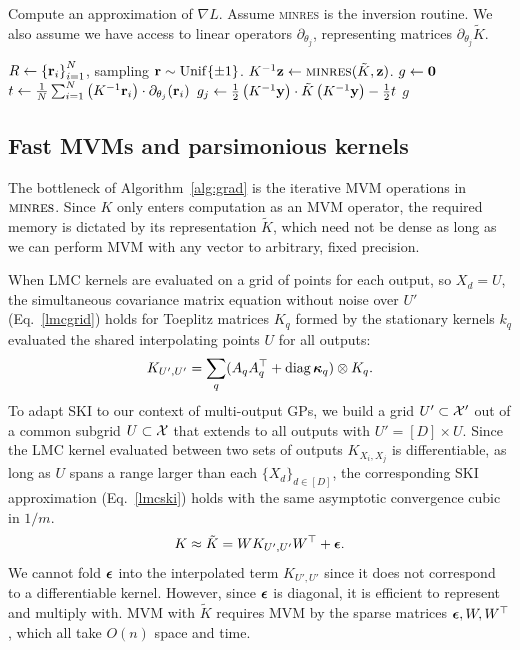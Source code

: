 \documentclass{article}
\begin{document}
\begin{algorithm}[!ht]
  \caption{Compute an approximation of $\nabla L$. Assume \textsc{minres} is the inversion routine. We also assume we have access to linear operators $\partial_{\theta_j}$, representing matrices $\partial_{\theta_j}\tilde{K}$.} \label{alg:grad}
\begin{algorithmic}[1]
  \State $R\gets\left\{ {\textbf{r}}_i \right\}_{ i=1 }^{ N }$, sampling ${\textbf{r}}\sim\operatorname{Unif}\{\pm 1\}$.
\State $K^{-1}\textbf{z}\gets\textsc{minres}(\tilde{K},\textbf{z})$.
\EndFor
\State $g\gets \textbf{0}$
\State $t\gets \frac{1}{N}\sum_{i=1}^{N}\left({K^{-1}{\textbf{r}}_i}\right)\cdot \partial_{\theta_j}({\textbf{r}}_i)$
\State $g_j\gets \frac{1}{2}\left({K^{-1}\textbf{y}}\right)\cdot \tilde{K}\left({K^{-1}\textbf{y}}\right)-\frac{1}{2}t$
\EndFor
\State \Return $g$ 
\EndProcedure
\end{algorithmic}
\end{algorithm}

\subsection{Fast MVMs and parsimonious kernels}\label{fast-mvm}

The bottleneck of Algorithm~\ref{alg:grad} is the iterative MVM operations in $\textsc{minres}$. Since $K$ only enters computation as an MVM operator, the required memory is dictated by its representation $\tilde{K}$, which need not be dense as long as we can perform MVM with any vector to arbitrary, fixed precision.

When LMC kernels are evaluated on a grid of points for each output, so $X_d=U$, the simultaneous covariance matrix equation without noise over ${U'}$  (Eq.~\ref{lmcgrid}) holds for Toeplitz matrices $K_q$ formed by the stationary kernels $k_q$ evaluated the shared interpolating points $U$ for all outputs:
\begin{align}
  K_{{U'},{U'}}=\sum_q(A_qA_q^\top+\operatorname{diag}{\boldsymbol\kappa}_q)\otimes K_q\label{lmcgrid}.
\end{align}
To adapt SKI to our context of multi-output GPs, we build a grid ${U'}\subset\mathcal{X}'$ out of a common subgrid $U\subset\mathcal{X}$ that extends to all outputs with ${U'} = [D]\times U$. Since the LMC kernel evaluated between two sets of outputs $K_{X_i,X_j}$ is differentiable, as long as $U$ spans a range larger than each $\{X_d\}_{d\in[D]}$, the corresponding SKI approximation (Eq.~\ref{lmcski}) holds with the same asymptotic convergence cubic in $1/m$.
\begin{align}
  K\approx \tilde{K}=WK_{{U'},{U'}}W^\top+{\boldsymbol\epsilon}.\label{lmcski}
\end{align}
We cannot fold ${\boldsymbol\epsilon}$ into the interpolated term $K_{{U'},{U'}}$ since it does not correspond to a differentiable kernel. However, since ${\boldsymbol\epsilon}$ is diagonal, it is efficient to represent and multiply with. MVM with $\tilde{K}$ requires MVM by the sparse matrices ${\boldsymbol\epsilon}, W,W^\top$, which all take $O(n)$ space and time.
\end{document}
